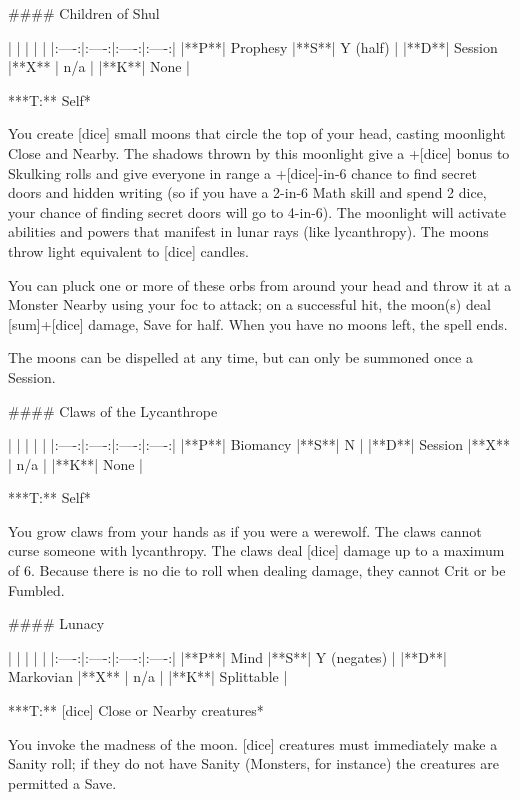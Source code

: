 #### Children of Shul

| | | | |
|:----:|:----:|:----:|:----:|
|**P**| Prophesy |**S**|  Y (half) |
|**D**| Session |**X** |  n/a  |
|**K**| None |


***T:**   Self*



You create [dice] small moons that circle the top of your head, casting moonlight Close and Nearby.  The shadows thrown by this moonlight give a +[dice] bonus to Skulking rolls and give everyone in range a +[dice]-in-6 chance to find secret doors and hidden writing (so if you have a 2-in-6 Math skill and spend 2 dice, your chance of finding secret doors will go to 4-in-6). The moonlight will activate abilities and powers that manifest in lunar rays (like lycanthropy).  The moons throw light equivalent to [dice] candles.

You can pluck one or more of these orbs from around your head and throw it at a Monster Nearby using your {foc} to attack; on a successful hit, the moon(s) deal [sum]+[dice] damage, Save for half.  When you have no moons left, the spell ends.

The moons can be dispelled at any time, but can only be summoned once a Session.




#### Claws of the Lycanthrope

| | | | |
|:----:|:----:|:----:|:----:|
|**P**| Biomancy |**S**|  N |
|**D**| Session |**X** |  n/a  |
|**K**| None |


***T:**   Self*



You grow claws from your hands as if you were a werewolf.  The claws cannot curse someone with lycanthropy.  The claws deal [dice] damage up to a maximum of 6. Because there is no die to roll when dealing damage, they cannot Crit or be Fumbled. 





#### Lunacy

| | | | |
|:----:|:----:|:----:|:----:|
|**P**| Mind |**S**|  Y (negates) |
|**D**| Markovian |**X** |  n/a  |
|**K**| Splittable |


***T:**   [dice] Close or Nearby creatures*



You invoke the madness of the moon.  [dice] creatures must immediately make a Sanity roll; if they do not have Sanity (Monsters, for instance) the creatures are permitted a Save.

